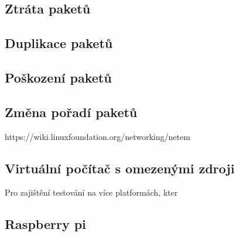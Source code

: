 \subsection*{Ztráta paketů}

\subsection*{Duplikace paketů}

\subsection*{Poškození paketů}

\subsection*{Změna pořadí paketů}

https://wiki.linuxfoundation.org/networking/netem

\subsection{Virtuální počítač s omezenými zdroji}

Pro zajištění testování na více platformách, kter

\subsection{Raspberry pi}